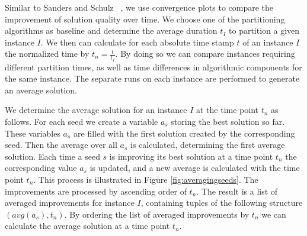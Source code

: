 \documentclass[a4paper,12pt,titlepage, BCOR7mm,headsepline]{scrbook}
\numberwithin{equation}{section}
\begin{document}
% 
Similar to Sanders and Schulz~\cite{sanders2012distributed}%
, we use convergence plots to compare the improvement of solution quality over time. We choose one of the partitioning algorithms as baseline and determine the average duration $t_I$ to partition a given instance $I$.
We then can calculate for each absolute time stamp $t$ of an instance $I$ the normalized time by $t_n = \frac{t}{t_I}$. By doing so we can %
compare instances requiring different partition times, as well as time differences in algorithmic components for the same instance.
The separate runs on each instance are performed to generate an average solution.

We determine the average solution for an instance $I$ at the time point $t_n$ as follows. For each seed we create a variable $a_s$ storing the best solution so far. These variables $a_s$ are filled with the first solution created by the corresponding seed. Then the average over all $a_s$ is calculated, determining the first average solution. Each time a seed $s$ is improving its best solution at a time point $t_n$ the corresponding value $a_s$ is updated, and a new average is calculated with the time point $t_n$. This process is illustrated in Figure \ref{fig:averagingseeds}. The improvements are processed by ascending order of $t_n$. The result is a list of averaged improvements for instance $I$, containing tuples of the following structure $(avg(a_s), t_n)$. By ordering the list of averaged improvements by $t_n$ we can calculate the average solution at a time point $t_n$.
\end{document}
